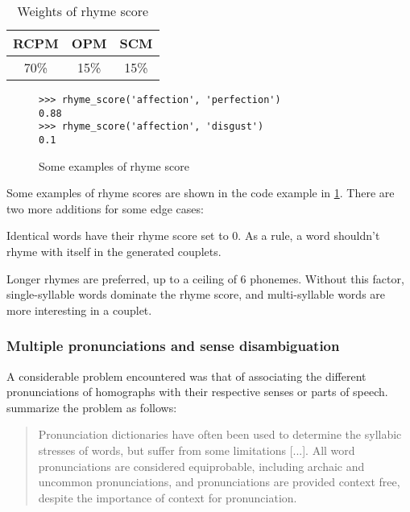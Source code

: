\documentclass[11pt,a4paper]{article}
\newenvironment{tight_enumerate}{
\begin{enumerate}
\setlength{\itemsep}{0pt}
\setlength{\parskip}{0pt}
}{\end{enumerate}}
\begin{document}
\begin{table}[ht]
\centering
\begin{tabular}{c c c}
	\hline\hline
	RCPM & OPM & SCM \\ [0.5ex]
	\hline
	70\% & 15\% & 15\% \\ [0.5ex]
	\hline
\end{tabular}
\caption{Weights of rhyme score}
\label{table:weight_rhyme_score}
\end{table}

\begin{figure}
\begin{Verbatim}[fontsize=\small]
>>> rhyme_score('affection', 'perfection')
0.88
>>> rhyme_score('affection', 'disgust')
0.1
\end{Verbatim}
\caption{Some examples of rhyme score}
\label{fig:rhymescorecode}
\end{figure}

Some examples of rhyme scores are shown in the code example in \ref{fig:rhymescorecode}. There are two more additions for some edge cases:

\begin{tight_enumerate}
	\vspace{-0.5em}
	\item
		Identical words have their rhyme score set to 0. As a rule, a word shouldn't rhyme with itself in the generated couplets.
	\item
		Longer rhymes are preferred, up to a ceiling of 6 phonemes. Without this factor, single-syllable words dominate the rhyme score, and multi-syllable words are more interesting in a couplet.
\end{tight_enumerate}

\subsubsection{Multiple pronunciations and sense disambiguation}

A considerable problem encountered was that of associating the different pronunciations of homographs with their respective senses or parts of speech. \citet{hopkins-kiela-2017} summarize the problem as follows:

\begin{quote}
Pronunciation dictionaries have often been used to determine the syllabic stresses of words, but suffer from some limitations [...]. All word pronunciations are considered equiprobable, including archaic and uncommon pronunciations, and pronunciations are provided context free, despite the importance of context for pronunciation.
\end{quote}
\end{document}
